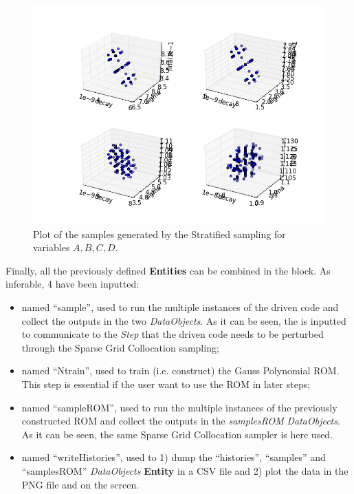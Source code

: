 \begin{enumerate}
\begin{figure}[h!]
  \includegraphics[scale=0.7]{pics/samples_SparseGrid.png}
  \caption{Plot of the samples generated by the Stratified sampling for variables $A,B,C,D$.}
  \label{fig:samplesSparseGridPlotLine}
 \end{figure}
   Finally, all the previously defined \textbf{Entities} can be combined in 
   the  block. As inferable, 
   4  have been inputted:
   \begin{itemize}
     \item {} named ``sample'', used to run the multiple  
     instances of the driven code and 
     collect the outputs in the two \textit{DataObjects}. As it can be
     seen, the  is inputted to communicate to the 
     \textit{Step} that the driven code needs to
     be perturbed through the Sparse Grid Collocation  sampling;
     \item {} named ``Ntrain'', used to train (i.e. 
     construct) the Gauss Polynomial ROM. This step is essential if the
     user want to use the ROM in later steps;
     \item {} named ``sampleROM'', used to run the multiple  
     instances of the previously constructed ROM and 
     collect the outputs in the \textit{samplesROM} \textit{DataObjects}.  
     As it can be seen, the same Sparse Grid Collocation sampler is
     here used.
     \item  {} named ``writeHistories'', used to 1) dump 
     the ``histories'', ``samples'' and ``samplesROM'' \textit{DataObjects} 
     \textbf{Entity} in a CSV file and 2) plot the data in the PNG file and 
     on the screen.
   \end{itemize}
\end{enumerate} 

